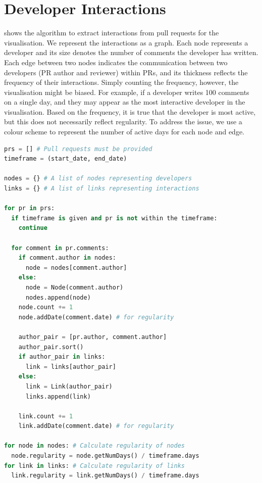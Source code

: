 \documentclass[sigconf]{acmart}
\begin{document}
\section{Developer Interactions}
\label{sec:algorithm}
%

 shows the algorithm to extract interactions from pull requests for the visualisation.
We represent the interactions as a graph.
Each node represents a developer and its size denotes the number of comments the developer has written.
Each edge between two nodes indicates the communication between two developers (PR author and reviewer) within PRs, and its thickness reflects the frequency of their interactions.
Simply counting the frequency, however, the visualisation might be biased.
For example, if a developer writes 100 comments on a single day, and they may appear as the most interactive developer in the visualisation.
Based on the frequency, it is true that the developer is most active, but this does not necessarily reflect regularity.
To address the issue, we use a colour scheme to represent the number of active days for each node and edge.

\begin{minipage}{.95\linewidth}
\begin{lstlisting}[language=Python, caption=Algorithm to extract interactions, label=algorithm]
prs = [] # Pull requests must be provided
timeframe = (start_date, end_date)

nodes = {} # A list of nodes representing developers
links = {} # A list of links representing interactions

for pr in prs:
  if timeframe is given and pr is not within the timeframe:
    continue

  for comment in pr.comments:
    if comment.author in nodes:
      node = nodes[comment.author]
    else:
      node = Node(comment.author)
      nodes.append(node)
    node.count += 1
    node.addDate(comment.date) # for regularity

    author_pair = [pr.author, comment.author]
    author_pair.sort()
    if author_pair in links:
      link = links[author_pair]
    else:
      link = Link(author_pair)
      links.append(link)

    link.count += 1
    link.addDate(comment.date) # for regularity

for node in nodes: # Calculate regularity of nodes
  node.regularity = node.getNumDays() / timeframe.days
for link in links: # Calculate regularity of links 
  link.regularity = link.getNumDays() / timeframe.days

\end{lstlisting}
\end{minipage}
\end{document}
